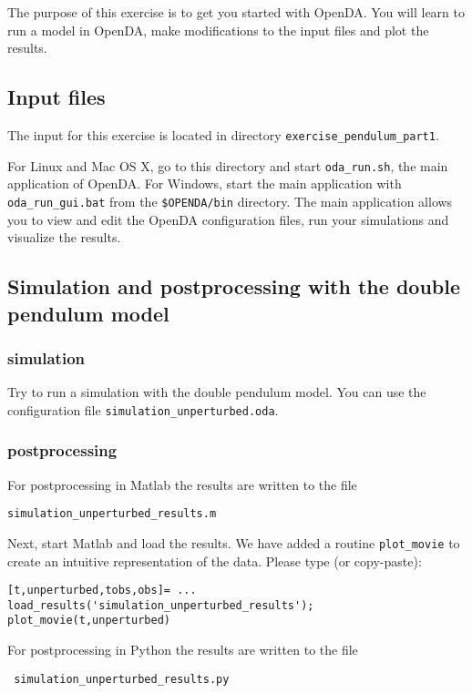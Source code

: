 The purpose of this exercise is to get you started with OpenDA. You will learn
to run a model in OpenDA, make modifications to the input files and plot the
results.
\subsection{Input files}
The input for this exercise is located in directory \lstinline{exercise_pendulum_part1}. 

For Linux and Mac OS X, go to this directory and start \lstinline{oda_run.sh}, the
main application of OpenDA. For Windows, start the main application with 
\lstinline{oda_run_gui.bat} from the \lstinline{$OPENDA/bin} directory. The main 
application allows you to view and edit the OpenDA configuration files, run your
simulations and visualize the results.

\subsection{Simulation and postprocessing with the double pendulum model}
\subsubsection{simulation}
Try to run a simulation with the double pendulum model. You can use the configuration file \lstinline{simulation_unperturbed.oda}. 

\subsubsection{postprocessing}      
\ifshowmatlab
      For postprocessing in Matlab the results are written to the file
      \begin{center}
        \lstinline{simulation_unperturbed_results.m}
      \end{center}
      Next, start Matlab and load the results. We have added a routine \lstinline{plot_movie} to create an intuitive
      representation of the data. Please type (or copy-paste):
      \begin{lstlisting}[style=MatlabStyle,caption={Matlab}]
[t,unperturbed,tobs,obs]= ...
load_results('simulation_unperturbed_results');
plot_movie(t,unperturbed)\end{lstlisting}
\fi
      
For postprocessing in Python the results are written to the file
\begin{center}
  \texttt{ simulation\_unperturbed\_results.py}
\end{center}
      
